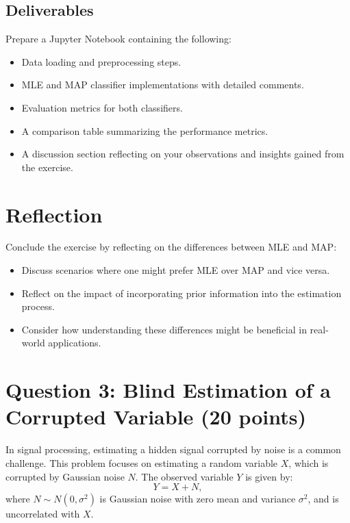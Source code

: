 \documentclass{article}
\begin{document}
\subsection*{Deliverables}
Prepare a Jupyter Notebook containing the following:
\begin{itemize}
    \item Data loading and preprocessing steps.
    \item MLE and MAP classifier implementations with detailed comments.
    \item Evaluation metrics for both classifiers.
    \item A comparison table summarizing the performance metrics.
    \item A discussion section reflecting on your observations and insights gained from the exercise.
\end{itemize}

\section*{Reflection}
Conclude the exercise by reflecting on the differences between MLE and MAP:
\begin{itemize}
    \item Discuss scenarios where one might prefer MLE over MAP and vice versa.
    \item Reflect on the impact of incorporating prior information into the estimation process.
    \item Consider how understanding these differences might be beneficial in real-world applications.
\end{itemize}










\section*{Question 3: Blind Estimation of a Corrupted Variable (20 points)}
In signal processing, estimating a hidden signal corrupted by noise is a common challenge. This problem focuses on estimating a random variable \( X \), which is corrupted by Gaussian noise \( N \). The observed variable \( Y \) is given by:
\[
Y = X + N,
\]
where \( N \sim N(0, \sigma^2) \) is Gaussian noise with zero mean and variance \( \sigma^2 \), and is uncorrelated with \( X \).
\end{document}
